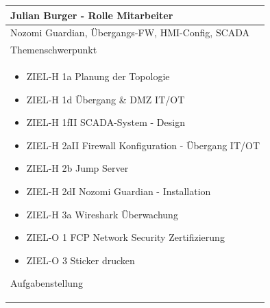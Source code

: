 \documentclass[
	headings=optiontotocandhead,%
	oneside,
	numbers=noenddot,%
	toc=flat, %
	10pt, %
	parskip=full, %
	listof=totoc, %
	listof=flat, %
	numbers=noenddot, %
	bibliography=totoc, %
	a4paper,DIV=14,
]{scrartcl}
\begin{document}
\begin{table}[H]
	\begin{tabularx} {\textwidth} {
			|>{\hsize=1\hsize}X|
		}
		
		\hline
		\rowcolor[HTML]{D9D9D9} 
		\rule{0pt}{15pt}
		\textbf{\normalsize{Julian Burger - Rolle Mitarbeiter}} \\ \hline
		
		\rule{0pt}{20pt} Nozomi Guardian, Übergangs-FW, HMI-Config, SCADA \\
		\rule{0pt}{11pt}\textcolor[HTML]{A6A6A6}{\footnotesize{Themenschwerpunkt}} \\ \hline
		
		\begin{itemize}[itemsep=0pt, parsep=0pt, topsep=0pt]
			\item{ZIEL-H 1a Planung der Topologie}
			\item{ZIEL-H 1d Übergang \& DMZ IT/OT}
			\item{ZIEL-H 1fII SCADA-System - Design}
			\item{ZIEL-H 2aII Firewall Konfiguration - Übergang IT/OT}
			\item{ZIEL-H 2b Jump Server}
			\item{ZIEL-H 2dI Nozomi Guardian - Installation}
			\item{ZIEL-H 3a Wireshark Überwachung}
			\item{ZIEL-O 1 FCP Network Security Zertifizierung}
			\item{ZIEL-O 3 Sticker drucken}
		\end{itemize}
		
		\rule{0pt}{11pt}\textcolor[HTML]{A6A6A6}{\footnotesize{Aufgabenstellung}} \\ \hline
	\end{tabularx}
\end{table}
\end{document}
